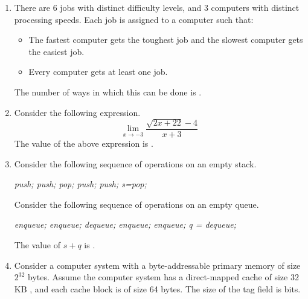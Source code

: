 \documentclass[a4paper, 11pt]{article}
\begin{document}
\begin{enumerate}
    \hfill{}
    
    \item There are 6 jobs with distinct difficulty levels, and 3 computers with distinct processing speeds. Each job is assigned to a computer such that:
    \begin{itemize}
        \item The fastest computer gets the toughest job and the slowest computer gets the easiest job.
        \item Every computer gets at least one job.
    \end{itemize}
    The number of ways in which this can be done is \underline{\hspace{2cm}}.
    
    \hfill{}
    
    \item Consider the following expression.
    \[ \lim_{x\rightarrow-3}\frac{\sqrt{2x+22}-4}{x+3} \]
    The value of the above expression  is \underline{\hspace{2cm}}.
    
    \hfill{}
    
    \item Consider the following sequence of operations on an empty stack.\\
    \begin{center}
    \textit{
    push; push; pop\brak{}; push; push; s=pop\brak{};
    }
    \end{center}
    Consider the following sequence of operations on an empty queue.
    \begin{center}
    \textit{
    enqueue; enqueue; dequeue\brak{}; enqueue; enqueue; q = dequeue\brak{};
    }
    \end{center}
    The value of $s+q$ is \underline{\hspace{2cm}}.
    \hfill{}
    
    \item Consider a computer system with a byte-addressable primary memory of size $2^{32}$ bytes. Assume the computer system has a direct-mapped cache of size 32 KB , and each cache block is of size 64 bytes. The size of the tag field is \underline{\hspace{2cm}} bits.
    \hfill{}
    

\end{enumerate}
\end{document}
